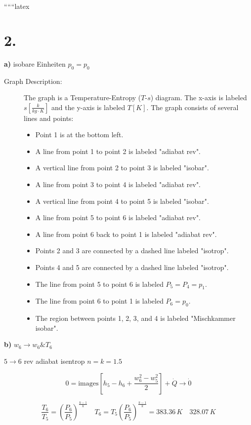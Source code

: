 
``````latex


\section*{2.}
\textbf{a)} isobare Einheiten $p_0 = p_0$

\begin{description}
    \item[Graph Description:] The graph is a Temperature-Entropy ($T$-$s$) diagram. The x-axis is labeled $s \left[ \frac{k}{kg \cdot K} \right]$ and the y-axis is labeled $T [K]$. The graph consists of several lines and points:
    \begin{itemize}
        \item Point 1 is at the bottom left.
        \item A line from point 1 to point 2 is labeled "adiabat rev".
        \item A vertical line from point 2 to point 3 is labeled "isobar".
        \item A line from point 3 to point 4 is labeled "adiabat rev".
        \item A vertical line from point 4 to point 5 is labeled "isobar".
        \item A line from point 5 to point 6 is labeled "adiabat rev".
        \item A line from point 6 back to point 1 is labeled "adiabat rev".
        \item Points 2 and 3 are connected by a dashed line labeled "isotrop".
        \item Points 4 and 5 are connected by a dashed line labeled "isotrop".
        \item The line from point 5 to point 6 is labeled $P_5 = P_4 = p_1$.
        \item The line from point 6 to point 1 is labeled $P_6 = p_0$.
        \item The region between points 1, 2, 3, and 4 is labeled "Mischkammer isobar".
    \end{itemize}
\end{description}

\textbf{b)} $w_6 \rightarrow w_6 \& T_6$

$5 \rightarrow 6$ rev adiabat isentrop $n = k = 1.5$

\[
0 = \text{images} \left[ h_5 - h_6 + \frac{w_6^2 - w_5^2}{2} \right] + \dot{Q} \rightarrow \dot{0}
\]

\[
\frac{T_6}{T_5} = \left( \frac{P_6}{P_5} \right)^{\frac{k-1}{k}} \quad T_6 = T_5 \left( \frac{P_6}{P_5} \right)^{\frac{k-1}{k}} = 383.36 \, K \quad 328.07 \, K
\]


